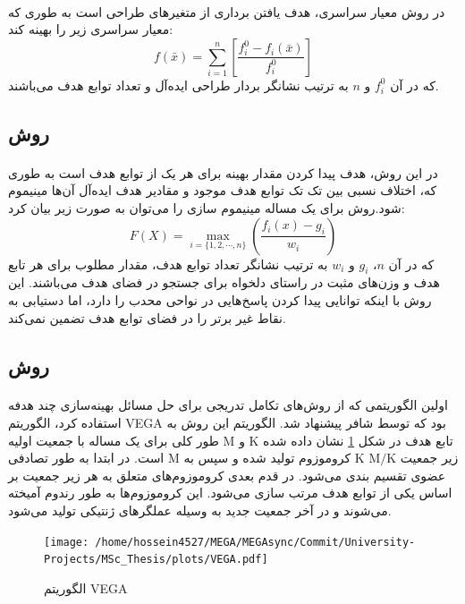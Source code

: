 \documentclass[a4paper,titlepage,12pt,fleqn,oneside]{report}
\begin{document}
	\paragraph{}
	در روش معیار سراسری، هدف یافتن برداری از متغیر‌های طراحی است به طوری که معیار سراسری زیر را بهینه کند:
	\begin{equation}
		f(\bar{x})=\sum_{i=1}^{n}\left[\frac{f_{i}^{0}-f_{i}(\bar{x})}{f_{i}^{0}}\right]
	\end{equation}
	که در آن $f_{i}^{0}$ و $n$ به ترتیب نشانگر بردار طراحی ایده‌آل و تعداد توابع هدف می‌باشند.
	\subsection{روش }
	\paragraph{}
	در این روش، هدف پیدا کردن مقدار بهینه برای هر یک از توابع هدف است به طوری که، اختلاف نسبی بین تک تک توابع هدف موجود و مقادیر هدف ایده‌آل آن‌ها مینیموم شود.روش  برای یک مساله مینیموم سازی را می‌توان به صورت زیر بیان کرد: 
	\begin{equation}
		F(X)=\max _{i=\{1,2, \cdots, n\}}\left(\frac{f_{i}(x)-g_{i}}{w_{i}}\right)
	\end{equation}
	که در آن $n$، $g_{i}$ و $w_{i}$ به ترتیب نشانگر تعداد توابع هدف، مقدار مطلوب برای هر تابع هدف و وزن‌های مثبت در راستای دلخواه برای جستجو در فضای هدف می‌باشند. این روش با اینکه توانایی پیدا کردن پاسخ‌هایی در نواحی محدب را دارد، اما دستیابی به نقاط غیر برتر را در فضای توابع هدف تضمین نمی‌کند.
	\subsection{روش }
	\paragraph{}
	اولین الگوریتمی که از روش‌های تکامل تدریجی برای حل مسائل بهینه‌سازی چند هدفه استفاده کرد، الگوریتم VEGA بود که توسط شافر پیشنهاد شد.
	الگوریتم این روش به طور کلی برای یک مساله با جمعیت اولیه M و K تابع هدف در شکل \ref{fig:VEGA} نشان داده شده است. در ابتدا به طور تصادفی M کروموزوم تولید شده و سپس به K زیر جمعیت $\mathrm{M} / \mathrm{K}$ عضوی تقسیم بندی می‌شود. در قدم بعدی کروموزوم‌های متعلق به هر زیر جمعیت بر اساس یکی از توابع هدف مرتب سازی می‌شود. این کروموزوم‌ها به طور رندوم آمیخته می‌شوند و در آخر جمعیت جدید به وسیله عملگر‌های ژنتیکی تولید می‌شود.
	\begin{figure}[h!]
		\centering
		\texttt{[image: /home/hossein4527/MEGA/MEGAsync/Commit/University-Projects/MSc\_Thesis/plots/VEGA.pdf]}
		\caption{الگوریتم VEGA}
		\label{fig:VEGA}
	\end{figure}
\end{document}
